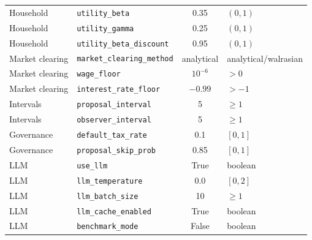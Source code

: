 \documentclass[12pt]{article}
\begin{document}
\begin{table}[tp]
\begin{tabular}{@{}llcl@{}}
Household & \texttt{utility\_beta} & 0.35 & $(0, 1)$ \\
Household & \texttt{utility\_gamma} & 0.25 & $(0, 1)$ \\
Household & \texttt{utility\_beta\_discount} & 0.95 & $(0, 1)$ \\
\midrule
Market clearing & \texttt{market\_clearing\_method} & analytical & analytical/walrasian \\
Market clearing & \texttt{wage\_floor} & $10^{-6}$ & $> 0$ \\
Market clearing & \texttt{interest\_rate\_floor} & $-0.99$ & $> -1$ \\
\midrule
Intervals & \texttt{proposal\_interval} & 5 & $\geq 1$ \\
Intervals & \texttt{observer\_interval} & 5 & $\geq 1$ \\
\midrule
Governance & \texttt{default\_tax\_rate} & 0.1 & $[0, 1]$ \\
Governance & \texttt{proposal\_skip\_prob} & 0.85 & $[0, 1]$ \\
\midrule
LLM & \texttt{use\_llm} & True & boolean \\
LLM & \texttt{llm\_temperature} & 0.0 & $[0, 2]$ \\
LLM & \texttt{llm\_batch\_size} & 10 & $\geq 1$ \\
LLM & \texttt{llm\_cache\_enabled} & True & boolean \\
LLM & \texttt{benchmark\_mode} & False & boolean \\
\bottomrule
\end{tabular}
\end{table}
\end{document}

